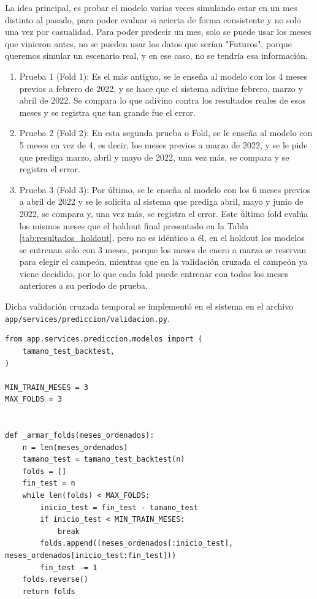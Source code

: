 La idea principal, es probar el modelo varias veces simulando estar en un mes distinto al pasado, para poder evaluar si acierta de forma consistente y no solo una vez por casualidad. Para poder predecir un mes, solo se puede usar los meses que vinieron antes, no se pueden usar los datos que serían "Futuros", porque queremos simular un escenario real, y en ese caso, no se tendría esa información.

\begin{enumerate}
    \item Prueba 1 (Fold 1): Es el más antiguo, se le enseña al modelo con los 4 meses previos a febrero de 2022, y se hace que el sistema adivine febrero, marzo y abril de 2022. Se compara lo que adivino contra los resultados reales de esos meses y se registra que tan grande fue el error.
    \item Prueba 2 (Fold 2): En esta segunda prueba o Fold, se le enseña al modelo con 5 meses en vez de 4, es decir, los meses previos a marzo de 2022, y se le pide que prediga marzo, abril y mayo de 2022, una vez más, se compara y se registra el error.

    \item Prueba 3 (Fold 3): Por último, se le enseña al modelo con los 6 meses previos a abril de 2022 y se le solicita al sistema que prediga abril, mayo y junio de 2022, se compara y, una vez más, se registra el error. Este último fold evalúa los mismos meses que el holdout final presentado en la Tabla \ref{tab:resultados_holdout}, pero no es idéntico a él, en el holdout los modelos se entrenan solo con 3 meses, porque los meses de enero a marzo se reservan para elegir el campeón, mientras que en la validación cruzada el campeón ya viene decidido, por lo que cada fold puede entrenar con todos los meses anteriores a su periodo de prueba.
\end{enumerate}


Dicha validación cruzada temporal se implementó en el sistema en el archivo \texttt{app/services/prediccion/validacion.py}.

\label{lst:validacion_folds}
\begin{verbatim}
from app.services.prediccion.modelos import (
    tamano_test_backtest,
)

MIN_TRAIN_MESES = 3
MAX_FOLDS = 3


def _armar_folds(meses_ordenados):
    n = len(meses_ordenados)
    tamano_test = tamano_test_backtest(n)
    folds = []
    fin_test = n
    while len(folds) < MAX_FOLDS:
        inicio_test = fin_test - tamano_test
        if inicio_test < MIN_TRAIN_MESES:
            break
        folds.append((meses_ordenados[:inicio_test], meses_ordenados[inicio_test:fin_test]))
        fin_test -= 1
    folds.reverse()
    return folds
\end{verbatim}


